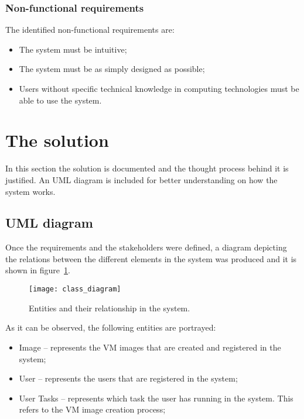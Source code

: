\subsubsection{Non-functional requirements}\label{subsubsec:nonfunct-reqs}

The identified non-functional requirements are:

\begin{itemize}
\item The system must be intuitive;
\item The system must be as simply designed as possible;
\item Users without specific technical knowledge in computing technologies must be able to use the system.
\end{itemize}

\section{The solution}\label{sec:solution}

In this section the solution is documented and the thought process behind it is justified. An UML diagram is included for better understanding on how the system works. 

\subsection{UML diagram}\label{subsec:uml-diag}

Once the requirements and the stakeholders were defined, a diagram depicting the relations between the different elements in the system was produced and it is shown in figure~\ref{fig:uml-diag}.

\begin{figure}[h]
  \begin{center} 
    \leavevmode 
    \texttt{[image: class\_diagram]}
    \caption{Entities and their relationship in the system.} 
    \label{fig:uml-diag} 
  \end{center}
\end{figure}

As it can be observed, the following entities are portrayed:

\begin{itemize}
\item Image -- represents the VM images that are created and registered in the system;
\item User -- represents the users that are registered in the system;
\item User Tasks -- represents which task the user has running in the system. This refers to the VM image creation process;
\end{itemize}

